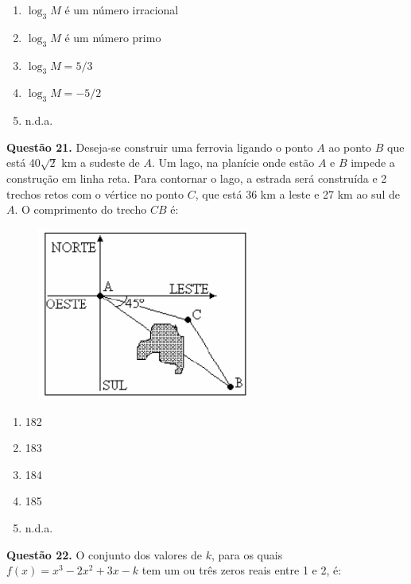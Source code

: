 \documentclass[11pt]{article}
\begin{document}
\begin{enumerate}[\bf A (\quad)]
    \item $\log_3 M$ é um número irracional
    \item $\log_3 M$ é um número primo 
    \item $\log_3 M = 5/3$
    \item $\log_3 M = -5/2$
    \item n.d.a.
\end{enumerate}

\textbf{Questão 21.} Deseja-se construir uma ferrovia ligando o ponto $A$ ao ponto $B$ que está 40$\sqrt{2}$ km a sudeste de $A$. Um lago, na planície  onde  estão  $A$  e  $B$  impede  a  construção  em  linha  reta.  Para  contornar  o  lago,  a  estrada  será  construída  e  2  trechos retos com o vértice no ponto $C$, que está 36 km a leste e 27 km ao sul de $A$. O comprimento do trecho $CB$ é:

\begin{figure}[h]

\centering %
\includegraphics[width=7cm]{imgs/q21.png} %
\end{figure}

\begin{multicols}{3}
    \begin{enumerate}[\bf A (\quad)]
        \item 182
        \item 183
        \item 184
        \item 185
        \item n.d.a.
    \end{enumerate}
\end{multicols}

\textbf{Questão 22.} O   conjunto   dos   valores   de   $k$,   para   os   quais $f(x) = x^3 - 2x^2 + 3x - k$ tem  um  ou  três  zeros  reais  entre 1 e 2, é: 
\end{document}
